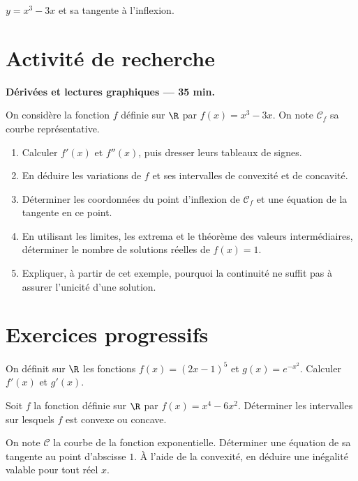 \begin{center}\par\small $y=x^3-3x$ et sa tangente à l'inflexion.\end{center}

\section{Activité de recherche}\textbf{Dérivées et lectures graphiques --- 35 min.}\par On considère la fonction $f$ définie sur $\R$ par $f(x)=x^3-3x$. On note $\mathcal C_f$ sa courbe représentative.
\begin{enumerate}\item Calculer $f' (x)$ et $f'' (x)$, puis dresser leurs tableaux de signes.
\item En déduire les variations de $f$ et ses intervalles de convexité et de concavité.
\item Déterminer les coordonnées du point d'inflexion de $\mathcal C_f$ et une équation de la tangente en ce point.
\item En utilisant les limites, les extrema et le théorème des valeurs intermédiaires, déterminer le nombre de solutions réelles de $f(x)=1$.
\item Expliquer, à partir de cet exemple, pourquoi la continuité ne suffit pas à assurer l'unicité d'une solution.\end{enumerate}

\section{Exercices progressifs}

On définit sur $\R$ les fonctions $f(x)=(2x-1)^5$ et $g(x)=e^{-x^2}$. Calculer $f' (x)$ et $g' (x)$.

Soit $f$ la fonction définie sur $\R$ par $f(x)=x^4-6x^2$. Déterminer les intervalles sur lesquels $f$ est convexe ou concave.

On note $\mathcal C$ la courbe de la fonction exponentielle. Déterminer une équation de sa tangente au point d'abscisse $1$. À l'aide de la convexité, en déduire une inégalité valable pour tout réel $x$.

